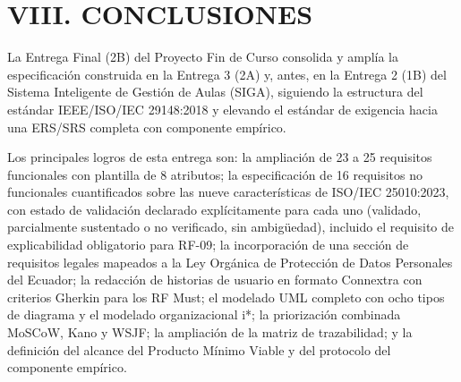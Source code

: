 \section*{VIII. CONCLUSIONES}


La Entrega Final (2B) del Proyecto Fin de Curso consolida y amplía la especificación construida en la Entrega 3 (2A) y, antes, en la Entrega 2 (1B) del Sistema Inteligente de Gestión de Aulas (SIGA), siguiendo la estructura del estándar IEEE/ISO/IEC 29148:2018 y elevando el estándar de exigencia hacia una ERS/SRS completa con componente empírico.


Los principales logros de esta entrega son: la ampliación de 23 a 25 requisitos funcionales con plantilla de 8 atributos; la especificación de 16 requisitos no funcionales cuantificados sobre las nueve características de ISO/IEC 25010:2023, con estado de validación declarado explícitamente para cada uno (validado, parcialmente sustentado o no verificado, sin ambigüedad), incluido el requisito de explicabilidad obligatorio para RF-09; la incorporación de una sección de requisitos legales mapeados a la Ley Orgánica de Protección de Datos Personales del Ecuador; la redacción de historias de usuario en formato Connextra con criterios Gherkin para los RF Must; el modelado UML completo con ocho tipos de diagrama y el modelado organizacional i*; la priorización combinada MoSCoW, Kano y WSJF; la ampliación de la matriz de trazabilidad; y la definición del alcance del Producto Mínimo Viable y del protocolo del componente empírico.


